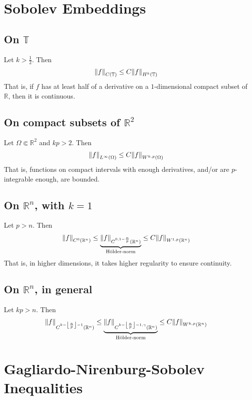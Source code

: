 \documentclass{article}
\def\Rl{\mathbb{R}}
\def\torus{\mathbb{T}}
\begin{document}
\section{Sobolev Embeddings}
    \subsection{On $\torus$}
        Let $k > \frac{1}{2}$.  Then
        \begin{align*}
            \norm{f}_{C(\torus)} \leq C\norm{f}_{H^k(\torus)}
        \end{align*}
        That is, if $f$ has at least half of a derivative on a $1$-dimensional compact subset of $\Rl$, then it is continuous.
    \subsection{On compact subsets of $\Rl^2$}
        Let $\Omega \Subset \Rl^2$ and $kp > 2$.  Then
        \begin{align*}
            \norm{f}_{L^\infty(\Omega)} \leq C\norm{f}_{W^{k,p}(\Omega)}
        \end{align*}
        That is, functions on compact intervals with enough derivatives, and/or are $p$-integrable enough, are bounded.
    \subsection{On $\Rl^n$, with $k = 1$}
        Let $p > n$.  Then
        \begin{align*}
            \norm{f}_{C^0(\Rl^n)} \leq \underbrace{\norm{f}_{C^{0,1 - \frac{n}{p}}(\Rl^n)}}_{\text{H\"{o}lder-norm}} \leq C\norm{f}_{W^{1,p}(\Rl^n)}
        \end{align*}
        That is, in higher dimensions, it takes higher regularity to ensure continuity.
    \subsection{On $\Rl^n$, in general}
        Let $kp > n$.  Then
        \begin{align*}
            \norm{f}_{C^{k - \left\lfloor\frac{n}{p}\right\rfloor - 1}(\Rl^n)} \leq \underbrace{\norm{f}_{C^{k - \left\lfloor\frac{n}{p}\right\rfloor - 1, \gamma}(\Rl^n)}}_{\text{H\"{o}lder-norm}} \leq C\norm{f}_{W^{k,p}(\Rl^n)}
        \end{align*}

\section{Gagliardo-Nirenburg-Sobolev Inequalities}
\end{document}
